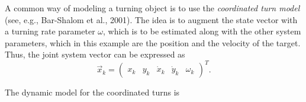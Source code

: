 A common way of modeling a turning object is to use the {\it
coordinated turn model} (see, e.g., Bar-Shalom et al., 2001). The idea
is to augment the state vector with a turning rate parameter $\omega$,
which is to be estimated along with the other system parameters, which
in this example are the position and the velocity of the target. Thus,
the joint system vector can be expressed as
%
\begin{equation} \vec{x}_k =
\begin{pmatrix} x_k & y_k & \dot{x}_k & \dot{y}_k & \omega_k
\end{pmatrix}^T.
%
\end{equation}
%

The dynamic model for the coordinated turns is

%
%
